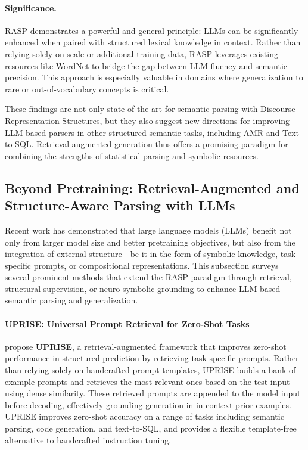 \paragraph{Significance.} RASP demonstrates a powerful and general principle: LLMs can be significantly enhanced when paired with structured lexical knowledge in context. Rather than relying solely on scale or additional training data, RASP leverages existing resources like WordNet to bridge the gap between LLM fluency and semantic precision. This approach is especially valuable in domains where generalization to rare or out-of-vocabulary concepts is critical.

These findings are not only state-of-the-art for semantic parsing with Discourse Representation Structures, but they also suggest new directions for improving LLM-based parsers in other structured semantic tasks, including AMR and Text-to-SQL. Retrieval-augmented generation thus offers a promising paradigm for combining the strengths of statistical parsing and symbolic resources.

\subsection{Beyond Pretraining: Retrieval-Augmented and Structure-Aware Parsing with LLMs}

Recent work has demonstrated that large language models (LLMs) benefit not only from larger model size and better pretraining objectives, but also from the integration of external structure—be it in the form of symbolic knowledge, task-specific prompts, or compositional representations. This subsection surveys several prominent methods that extend the RASP paradigm through retrieval, structural supervision, or neuro-symbolic grounding to enhance LLM-based semantic parsing and generalization.

\paragraph{UPRISE: Universal Prompt Retrieval for Zero-Shot Tasks}

\citet{cheng2023uprise} propose \textbf{UPRISE}, a retrieval-augmented framework that improves zero-shot performance in structured prediction by retrieving task-specific prompts. Rather than relying solely on handcrafted prompt templates, UPRISE builds a bank of example prompts and retrieves the most relevant ones based on the test input using dense similarity. These retrieved prompts are appended to the model input before decoding, effectively grounding generation in in-context prior examples. UPRISE improves zero-shot accuracy on a range of tasks including semantic parsing, code generation, and text-to-SQL, and provides a flexible template-free alternative to handcrafted instruction tuning.

